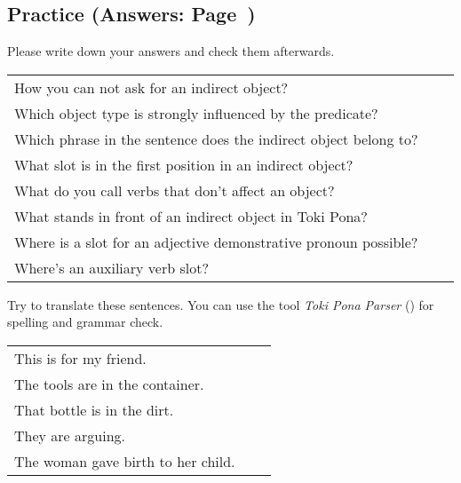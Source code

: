 %
\newpage
%
\subsection*{Practice (Answers: Page~\pageref{'indirect_objects'})}
%
Please write down your answers and check them afterwards. 

\begin{supertabular}{p{5,5cm}|ll}
How you can not ask for an indirect object? &&  \\ %
Which object type is strongly influenced by the predicate? &&   \\ %
Which phrase in the sentence does the indirect object belong to? &&  \\ %
What slot is in the first position in an indirect object? &&  \\ %
What do you call verbs that don't affect an object? &&  \\ %
What stands in front of an indirect object in Toki Pona? &&  \\ %
Where is a slot for an adjective demonstrative pronoun possible? &&  \\ %
Where's an auxiliary verb slot? &&  \\ %
\end{supertabular}

Try to translate these sentences. 
You can use the tool \textit{Toki Pona Parser} (\cite{www:rowa:02}) for spelling and grammar check. 

\begin{supertabular}{p{5,5cm}|ll}
This is for my friend.  &&  \\ %
The tools are in the container.  && \\ %
That bottle is in the dirt.  &&  \\ %
They are arguing. &&  \\ %
The woman gave birth to her child. &&  \\ %
\end{supertabular} 

%
